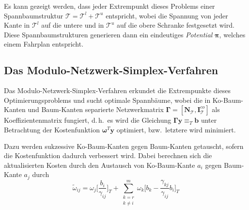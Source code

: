\documentclass[a4paper, 10pt, twocolumn]{scrartcl}
\newcommand{\mat}[1]{\boldsymbol{#1}}
\renewcommand{\vec}[1]{\boldsymbol{#1}}
\newcommand{\bzw}{bzw.~}
\renewcommand{\dh}{d.\,h.~}
\begin{document}
			Es kann gezeigt werden, dass jeder Extrempunkt dieses Problems einer Spannbaumstruktur \( \mathcal{T} = \mathcal{T}^l + \mathcal{T}^u \) entspricht, wobei die Spannung von jeder Kante in \( \mathcal{T}^l \) auf die untere und in \( \mathcal{T}^u \) auf die obere Schranke festgesetzt wird. Diese Spannbaumstrukturen generieren dann ein eindeutiges \emph{Potential}  \(\vec{\pi}\), welches einem Fahrplan entspricht.
	
	\subsection*{Das Modulo-Netzwerk-Simplex-Verfahren}
		Das Modulo-Netzwerk-Simplex-Verfahren erkundet die Extrempunkte dieses Optimierungsproblems und sucht optimale Spannbäume, wobei die in Ko-Baum-Kanten und Baum-Kanten separierte Netzwerkmatrix \( \mat{\Gamma} = [\mat{N}_\mathcal{T}, \mat{I}_\mathcal{T}^\mathit{co}] \) als Koeffizientenmatrix fungiert, \dh es wird die Gleichung \( \mat{\Gamma} \vec{y} \equiv_T \vec{b} \) unter Betrachtung der Kostenfunktion \( \vec{\omega}^T \vec{y} \) optimiert, \bzw letztere wird minimiert.
		
		Dazu werden sukzessive Ko-Baum-Kanten gegen Baum-Kanten getauscht, sofern die Kostenfunktion dadurch verbessert wird. Dabei berechnen sich die aktualisierten Kosten durch den Austausch von Ko-Baum-Kante \( a_i \) gegen Baum-Kante \( a_j \) durch
		\begin{equation*}
			\tilde{\omega}_{ij} = \omega_j \bigg[ \frac{b_i}{\gamma_{ij}} \bigg]_T \! + \sum_{\substack{k = r \\ k \neq i}}^{m} \omega_k \bigg[ b_k - \frac{\gamma_{kj}}{\gamma_{ij}} b_i \bigg]_T
		\end{equation*}
\end{document}
